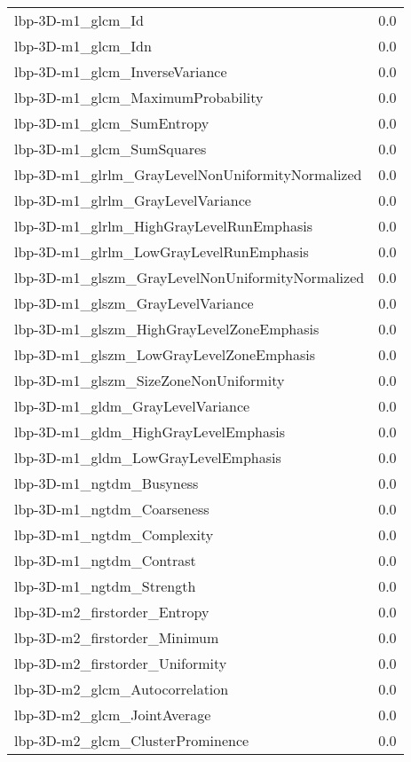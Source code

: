 {\begin{xltabular}[H]{\textwidth}{X r}
        lbp-3D-m1\_glcm\_Id & 0.0 \\
        lbp-3D-m1\_glcm\_Idn & 0.0 \\
        lbp-3D-m1\_glcm\_InverseVariance & 0.0 \\
        lbp-3D-m1\_glcm\_MaximumProbability & 0.0 \\
        lbp-3D-m1\_glcm\_SumEntropy & 0.0 \\
        lbp-3D-m1\_glcm\_SumSquares & 0.0 \\
        lbp-3D-m1\_glrlm\_GrayLevelNonUniformityNormalized & 0.0 \\
        lbp-3D-m1\_glrlm\_GrayLevelVariance & 0.0 \\
        lbp-3D-m1\_glrlm\_HighGrayLevelRunEmphasis & 0.0 \\
        lbp-3D-m1\_glrlm\_LowGrayLevelRunEmphasis & 0.0 \\
        lbp-3D-m1\_glszm\_GrayLevelNonUniformityNormalized & 0.0 \\
        lbp-3D-m1\_glszm\_GrayLevelVariance & 0.0 \\
        lbp-3D-m1\_glszm\_HighGrayLevelZoneEmphasis & 0.0 \\
        lbp-3D-m1\_glszm\_LowGrayLevelZoneEmphasis & 0.0 \\
        lbp-3D-m1\_glszm\_SizeZoneNonUniformity & 0.0 \\
        lbp-3D-m1\_gldm\_GrayLevelVariance & 0.0 \\
        lbp-3D-m1\_gldm\_HighGrayLevelEmphasis & 0.0 \\
        lbp-3D-m1\_gldm\_LowGrayLevelEmphasis & 0.0 \\
        lbp-3D-m1\_ngtdm\_Busyness & 0.0 \\
        lbp-3D-m1\_ngtdm\_Coarseness & 0.0 \\
        lbp-3D-m1\_ngtdm\_Complexity & 0.0 \\
        lbp-3D-m1\_ngtdm\_Contrast & 0.0 \\
        lbp-3D-m1\_ngtdm\_Strength & 0.0 \\
        lbp-3D-m2\_firstorder\_Entropy & 0.0 \\
        lbp-3D-m2\_firstorder\_Minimum & 0.0 \\
        lbp-3D-m2\_firstorder\_Uniformity & 0.0 \\
        lbp-3D-m2\_glcm\_Autocorrelation & 0.0 \\
        lbp-3D-m2\_glcm\_JointAverage & 0.0 \\
        lbp-3D-m2\_glcm\_ClusterProminence & 0.0 \\

\end{xltabular}}
